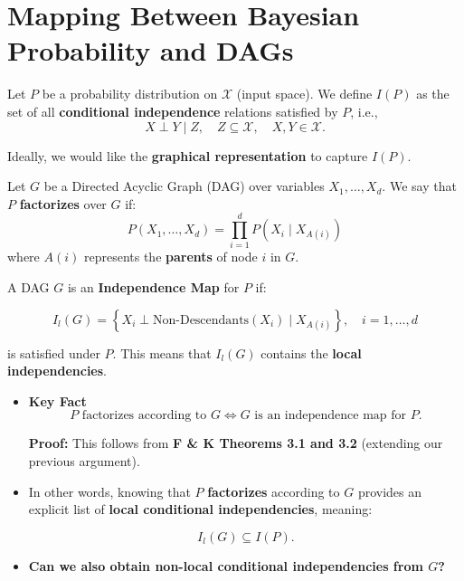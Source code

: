 \documentclass{article}%
\begin{document}
\section{Mapping Between Bayesian Probability and DAGs}

\begin{definition}
    Let \( P \) be a probability distribution on \( \mathcal{X} \) (input space). We define \( I(P) \) as the set of all \textbf{conditional independence} relations satisfied by \( P \), i.e.,
\[
X \perp Y \mid Z, \quad Z \subseteq \mathcal{X}, \quad X, Y \in \mathcal{X}.
\]
\end{definition}
Ideally, we would like the \textbf{graphical representation} to capture \( I(P) \).
\begin{definition}[factorization]
    Let \( G \) be a Directed Acyclic Graph (DAG) over variables \( X_1, \dots, X_d \). We say that \( P \) \textbf{factorizes} over \( G \) if:
    \[
    P(X_1, \dots, X_d) = \prod_{i=1}^{d} P(X_i \mid X_{A(i)})
    \]
    where \( A(i) \) represents the \textbf{parents} of node \( i \) in \( G \).    
\end{definition}
\begin{definition}
    A DAG \( G \) is an \textbf{Independence Map} for \( P \) if:

    \[
    I_l(G) = \left\{ X_i \perp \text{Non-Descendants}(X_i) \mid X_{A(i)} \right\}, \quad i = 1, \dots, d
    \]
    
    is satisfied under \( P \). This means that \( I_l(G) \) contains the \textbf{local independencies}.
\end{definition}

\begin{itemize}
    \item \textbf{Key Fact}
    \[
    P \text{ factorizes according to } G \iff G \text{ is an independence map for } P.
    \]
    
    \textbf{Proof: }
    This follows from \textbf{F \& K Theorems 3.1 and 3.2} (extending our previous argument).
    \item In other words, knowing that \( P \) \textbf{factorizes} according to \( G \) provides an explicit list of \textbf{local conditional independencies}, meaning:

    \[
    I_l(G) \subseteq I(P).
    \]
    \item \textbf{Can we also obtain non-local conditional independencies from \( G \)?}

\end{itemize}
\end{document}
